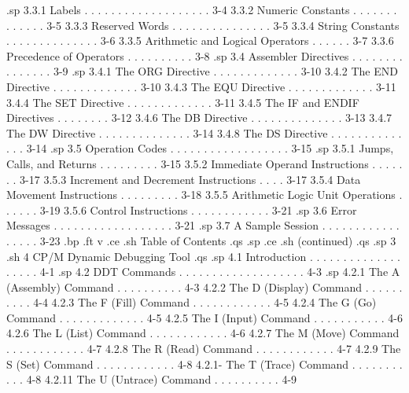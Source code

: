 .sp
        3.3.1  Labels . . . . . . . . . . . . . . . . . . .   3-4
        3.3.2  Numeric Constants  . . . . . . . . . . . . .   3-5
        3.3.3  Reserved Words . . . . . . . . . . . . . . .   3-5
        3.3.4  String Constants . . . . . . . . . . . . . .   3-6
        3.3.5  Arithmetic and Logical Operators . . . . . .   3-7
        3.3.6  Precedence of Operators  . . . . . . . . . .   3-8
.sp
   3.4  Assembler Directives  . . . . . . . . . . . . . . .   3-9
.sp
        3.4.1  The ORG Directive  . . . . . . . . . . . . .  3-10
        3.4.2  The END Directive  . . . . . . . . . . . . .  3-10
        3.4.3  The EQU Directive  . . . . . . . . . . . . .  3-11
        3.4.4  The SET Directive  . . . . . . . . . . . . .  3-11
        3.4.5  The IF and ENDIF Directives  . . . . . . . .  3-12
        3.4.6  The DB Directive . . . . . . . . . . . . . .  3-13
        3.4.7  The DW Directive . . . . . . . . . . . . . .  3-14
        3.4.8  The DS Directive . . . . . . . . . . . . . .  3-14
.sp
   3.5  Operation Codes . . . . . . . . . . . . . . . . . .  3-15
.sp
        3.5.1  Jumps, Calls, and Returns  . . . . . . . . .  3-15
        3.5.2  Immediate Operand Instructions . . . . . . .  3-17
        3.5.3  Increment and Decrement Instructions . . . .  3-17
        3.5.4  Data Movement Instructions . . . . . . . . .  3-18
        3.5.5  Arithmetic Logic Unit Operations . . . . . .  3-19
        3.5.6  Control Instructions . . . . . . . . . . . .  3-21
.sp
   3.6  Error Messages  . . . . . . . . . . . . . . . . . .  3-21
.sp
   3.7  A Sample Session  . . . . . . . . . . . . . . . . .  3-23
.bp
.ft                                v
.ce
.sh
Table of Contents
.qs
.sp
.ce
.sh
(continued)
.qs
.sp 3
.sh
4  CP/M Dynamic Debugging Tool
.qs
.sp
   4.1  Introduction  . . . . . . . . . . . . . . . . . . .   4-1
.sp
   4.2  DDT Commands  . . . . . . . . . . . . . . . . . . .   4-3
.sp
        4.2.1  The A (Assembly) Command . . . . . . . . . .   4-3
        4.2.2  The D (Display) Command  . . . . . . . . . .   4-4
        4.2.3  The F (Fill) Command . . . . . . . . . . . .   4-5
        4.2.4  The G (Go) Command . . . . . . . . . . . . .   4-5
        4.2.5  The I (Input) Command  . . . . . . . . . . .   4-6
        4.2.6  The L (List) Command . . . . . . . . . . . .   4-6
        4.2.7  The M (Move) Command . . . . . . . . . . . .   4-7
        4.2.8  The R (Read) Command . . . . . . . . . . . .   4-7
        4.2.9  The S (Set) Command  . . . . . . . . . . . .   4-8
        4.2.1- The T (Trace) Command  . . . . . . . . . . .   4-8
        4.2.11 The U (Untrace) Command  . . . . . . . . . .   4-9
